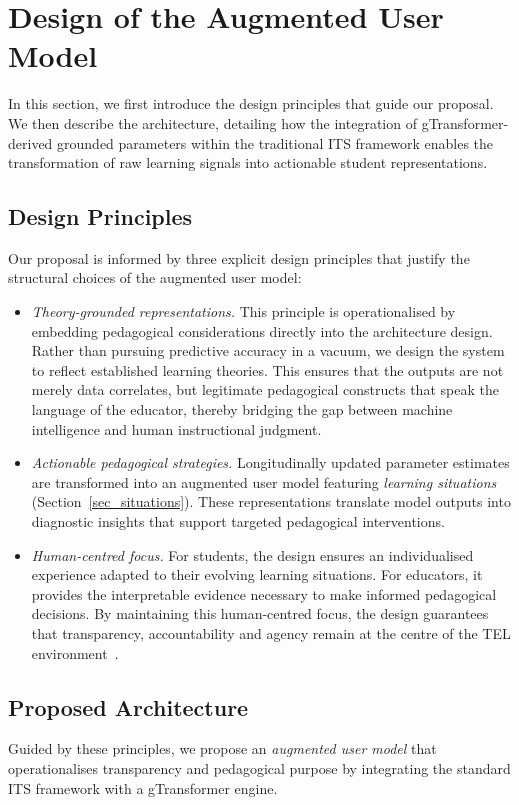 \documentclass[runningheads]{llncs}
\begin{document}
%
\section{Design of the Augmented User Model}
\label{sec_grounded}

In this section, we first introduce the design principles that guide our proposal. We then describe the architecture, detailing how the integration of gTransformer-derived grounded parameters within the traditional ITS framework enables the transformation of raw learning signals into actionable student representations.

\subsection{Design Principles}

Our proposal is informed by three explicit design principles that justify the structural choices of the augmented user model:

\begin{itemize}
\item \textit{Theory-grounded representations.} This principle is operationalised by embedding pedagogical considerations directly into the architecture design. Rather than pursuing predictive accuracy in a vacuum, we design the system to reflect established learning theories. This ensures that the outputs are not merely data correlates, but legitimate pedagogical constructs that speak the language of the educator, thereby bridging the gap between machine intelligence and human instructional judgment.
\item \textit{Actionable pedagogical strategies.} Longitudinally updated parameter estimates are transformed into an augmented user model featuring \textit{learning situations} (Section~\ref{sec_situations}). These representations translate model outputs into diagnostic insights that support targeted pedagogical interventions.
\item \textit{Human-centred focus.} For students, the design ensures an individualised experience adapted to their evolving learning situations. For educators, it provides the interpretable evidence necessary to make informed pedagogical decisions. By maintaining this human-centred focus, the design guarantees that transparency, accountability and agency remain at the centre of the TEL environment~\cite{Holmes2022504}.
\end{itemize}


\subsection{Proposed Architecture}
Guided by these principles, we propose an \textit{augmented user model} that operationalises transparency and pedagogical purpose by integrating the standard ITS framework with a gTransformer engine. 
\end{document}
